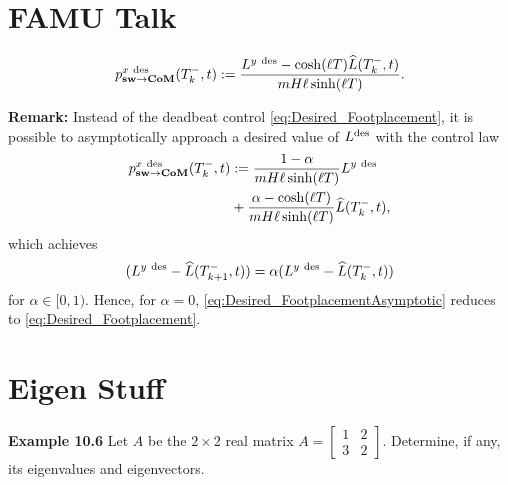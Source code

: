 \documentclass[letterpaper]{book}
\begin{document}
\section{FAMU Talk}

\Large

\begin{equation} \label{eq:Desired_Footplacement}
    p^{x~{\rm des}}_{\rm \bf sw \to CoM}(T_k^-,t) :=\frac{L^{y ~{\rm des}} - \cosh(\ell T)\widehat{L}(T_k^-,t)}{mH \ell \sinh(\ell T)}.
\end{equation}

\vspace*{.5cm}

\noindent \textbf{Remark:} Instead of the deadbeat control \eqref{eq:Desired_Footplacement}, it is possible to asymptotically approach a desired value of $L^{\rm des}$ with the control law
\begin{equation} \label{eq:Desired_FootplacementAsymptotic}
\begin{aligned}
    p^{x~{\rm des}}_{\rm \bf sw \to CoM}(T_k^-,t) &:=\frac{1 - \alpha }{mH \ell \sinh(\ell T)}L^{y ~{\rm des}} \\
   & +  \frac{\alpha - \cosh(\ell T)}{mH \ell \sinh(\ell T)} \widehat{L}(T_k^-,t),
    \end{aligned}
\end{equation}
which achieves
\begin{equation}
( L^{y~{\rm des}}-\widehat{L}(T_{k+1}^-,t))   = \alpha (L^{y~{\rm des}}-\widehat{L}(T_{k}^-,t))
\end{equation}
for $\alpha \in [0,1)$. Hence, for $\alpha = 0$, \eqref{eq:Desired_FootplacementAsymptotic} reduces to \eqref{eq:Desired_Footplacement}.

\newpage

\section{Eigen Stuff}
\large

\textbf{Example 10.6}  \label{ex:Chap10Eigen01} Let $A$ be the $2 \times 2$ real matrix
 $A=\left[\begin{array}{rr}
    1 & 2\\
    3 & 2
    \end{array}\right].$
Determine, if any, its eigenvalues and eigenvectors. 
\end{document}
